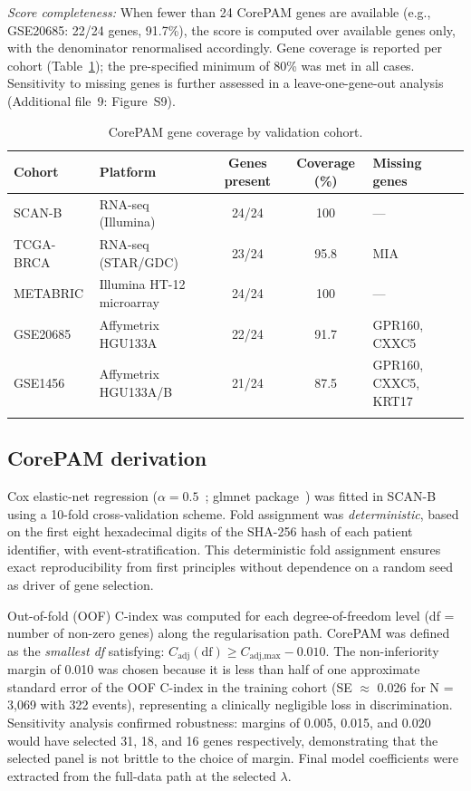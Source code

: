 \documentclass[referee,lineno,pdflatex,sn-vancouver-num]{sn-jnl}
\begin{document}
\textit{Score completeness:} When fewer than 24 CorePAM genes are available (e.g., GSE20685: 22/24 genes, 91.7\%), the score is computed over available genes only, with the denominator renormalised accordingly. Gene coverage is reported per cohort (Table~\ref{tab:coverage}); the pre-specified minimum of 80\% was met in all cases. Sensitivity to missing genes is further assessed in a leave-one-gene-out analysis (Additional file~9: Figure~S9).

\begin{table}[h]
\caption{CorePAM gene coverage by validation cohort.}\label{tab:coverage}
\begin{tabular}{@{}llccl@{}}
\toprule
Cohort & Platform & Genes present & Coverage (\%) & Missing genes \\
\midrule
SCAN-B & RNA-seq (Illumina) & 24/24 & 100 & --- \\
TCGA-BRCA & RNA-seq (STAR/GDC) & 23/24 & 95.8 & MIA \\
METABRIC & Illumina HT-12 microarray & 24/24 & 100 & --- \\
GSE20685 & Affymetrix HGU133A & 22/24 & 91.7 & GPR160, CXXC5 \\
GSE1456 & Affymetrix HGU133A/B & 21/24 & 87.5 & GPR160, CXXC5, KRT17 \\
\botrule
\end{tabular}
\end{table}

\subsection{CorePAM derivation}\label{subsec:corepam-derivation}

Cox elastic-net regression ($\alpha = 0.5$~\cite{zou2005,tibshirani1997}; glmnet package~\cite{friedman2010,simon2011}) was fitted in SCAN-B using a 10-fold cross-validation scheme. Fold assignment was \textit{deterministic}, based on the first eight hexadecimal digits of the SHA-256 hash of each patient identifier, with event-stratification. This deterministic fold assignment ensures exact reproducibility from first principles without dependence on a random seed as driver of gene selection.

Out-of-fold (OOF) C-index was computed for each degree-of-freedom level (df = number of non-zero genes) along the regularisation path. CorePAM was defined as the \textit{smallest df} satisfying: $C_{\text{adj}}(\text{df}) \geq C_{\text{adj,max}} - 0.010$. The non-inferiority margin of 0.010 was chosen because it is less than half of one approximate standard error of the OOF C-index in the training cohort (SE $\approx$ 0.026 for N = 3,069 with 322 events), representing a clinically negligible loss in discrimination. Sensitivity analysis confirmed robustness: margins of 0.005, 0.015, and 0.020 would have selected 31, 18, and 16 genes respectively, demonstrating that the selected panel is not brittle to the choice of margin. Final model coefficients were extracted from the full-data path at the selected $\lambda$.
\end{document}
